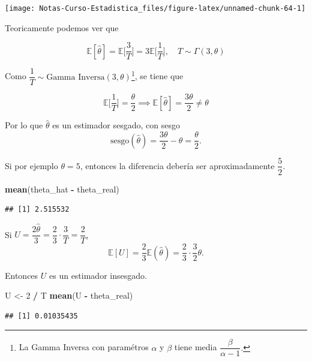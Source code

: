 \documentclass[
  12pt,
]{book}
\newenvironment{Shaded}{\begin{snugshade}}{\end{snugshade}}
\newcommand{\DecValTok}[1]{\textcolor[rgb]{0.00,0.00,0.81}{#1}}
\newcommand{\KeywordTok}[1]{\textcolor[rgb]{0.13,0.29,0.53}{\textbf{#1}}}
\newcommand{\NormalTok}[1]{#1}
\newcommand{\OperatorTok}[1]{\textcolor[rgb]{0.81,0.36,0.00}{\textbf{#1}}}
\newcommand{\StringTok}[1]{\textcolor[rgb]{0.31,0.60,0.02}{#1}}
\begin{document}
\begin{center}\texttt{[image: Notas-Curso-Estadistica\_files/figure-latex/unnamed-chunk-64-1]} \end{center}

Teoricamente podemos ver que

\[\mathbb E[\hat\theta] = \mathbb E\bigg[\dfrac 3T\bigg]= 3\mathbb E\bigg[\dfrac
1T\bigg], \quad T\sim \Gamma(3,\theta)\]

Como \(\dfrac 1T \sim \text{Gamma Inversa}(3,\theta)\)\footnote{La Gamma Inversa con paramétros \(\alpha\) y \(\beta\) tiene media \(\dfrac{\beta}{\alpha-1}.\)}, se tiene que

\[\mathbb E\bigg[\dfrac 1T\bigg] = \dfrac{\theta}2 \implies \mathbb E[\hat
\theta] =\dfrac{3\theta}2 \neq \theta\]

Por lo que \(\hat \theta\) es un estimador sesgado, con sesgo
\[\text{sesgo}(\hat\theta) = \dfrac{3\theta}{2} -\theta = \dfrac \theta 2.\]

Si por ejemplo \(\theta=5\), entonces la diferencia debería ser aproximadamente
\(\dfrac 5 2\).

\begin{Shaded}
\begin{Highlighting}[]
\KeywordTok{mean}\NormalTok{(theta\_hat }\OperatorTok{{-}}\StringTok{ }\NormalTok{theta\_real)}
\end{Highlighting}
\end{Shaded}

\begin{verbatim}
## [1] 2.515532
\end{verbatim}

Si \(U = \dfrac {2\hat\theta}{3} = \dfrac 23 \cdot \dfrac{3}{T} = \dfrac 2T\),
\[\mathbb E[U] = \dfrac 23 \mathbb E(\hat\theta) =\dfrac 23 \cdot \dfrac 32 \theta.\]

Entonces \(U\) es un estimador insesgado.

\begin{Shaded}
\begin{Highlighting}[]
\NormalTok{U \textless{}{-}}\StringTok{ }\DecValTok{2} \OperatorTok{/}\StringTok{ }\NormalTok{T}
\KeywordTok{mean}\NormalTok{(U }\OperatorTok{{-}}\StringTok{ }\NormalTok{theta\_real)}
\end{Highlighting}
\end{Shaded}

\begin{verbatim}
## [1] 0.01035435
\end{verbatim}
\end{document}
